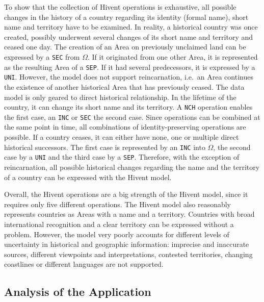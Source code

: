 To show that the collection of Hivent operations is exhaustive, all possible changes in the history of a country regarding its identity (formal name), short name and territory have to be examined. In reality, a historical country was once created, possibly underwent several changes of its short name and territory and ceased one day. The creation of an Area on previously unclaimed land can be expressed by a \texttt{SEC} from $\Omega$. If it originated from one other Area, it is represented as the resulting Area of a \texttt{SEP}. If it had several predecessors, it is expressed by a \texttt{UNI}. However, the model does not support reincarnation, i.e.\ an Area continues the existence of another historical Area that has previously ceased. The data model is only geared to direct historical relationship. In the lifetime of the country, it can change its short name and its territory. A \texttt{NCH} operation enables the first case, an \texttt{INC} or \texttt{SEC} the second case. Since operations can be combined at the same point in time, all combinations of identity-preserving operations are possible. If a country ceases, it can either have none, one or multiple direct historical successors. The first case is represented by an \texttt{INC} into $\Omega$, the second case by a \texttt{UNI} and the third case by a \texttt{SEP}. Therefore, with the exception of reincarnation, all possible historical changes regarding the name and the territory of a country can be expressed with the Hivent model.


Overall, the Hivent operations are a big strength of the Hivent model, since it requires only five different operations.
The Hivent model also reasonably represents countries as Areas with a name and a territory. Countries with broad international recognition and a clear territory can be expressed without a problem. However, the model very poorly accounts for different levels of uncertainty in historical and geographic information: imprecise and inaccurate sources, different viewpoints and interpretations, contested territories, changing coastlines or different languages are not supported.



\subsection{Analysis of the Application} %
\label{sub:application}

